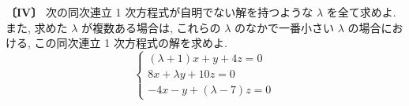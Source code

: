\noindent\textbf{〔IV〕}
次の同次連立 1 次方程式が自明でない解を持つような $\lambda$ を全て求めよ.
また, 求めた $\lambda$ が複数ある場合は, これらの $\lambda$ のなかで一番小さい $\lambda$ の場合における,
この同次連立 1 次方程式の解を求めよ.
\[
\begin{cases}
(\lambda+1)x+y+4z=0\\
8x+\lambda y+10z=0\\
-4x-y+(\lambda-7)z=0
\end{cases}
\]
